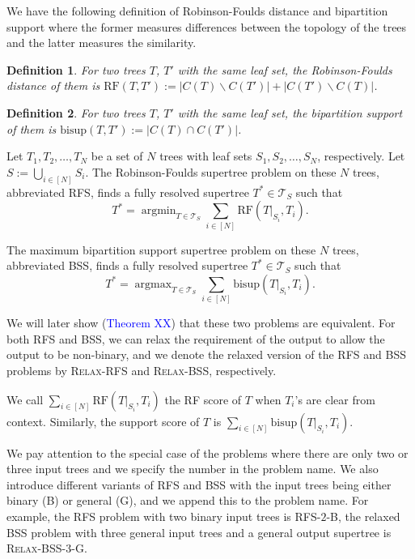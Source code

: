 \documentclass[twocolumn]{bmcart}%
\newcommand{\bs}{\mathrm{bisup}}
\newcommand{\RF}{\mathrm{RF}}
\newcommand{\bss}{\textsc{BSS}\xspace}
\newcommand{\rfs}{\textsc{RFS}\xspace}
\newcommand{\relaxed}{\textsc{Relax}-}
\newcommand{\bssthree}{\textsc{BSS-$3$}\xspace}
\newcommand{\rftwo}{\textsc{RFS-$2$}\xspace}
\newcommand{\B}{\textsc{B}\xspace}
\renewcommand{\G}{\textsc{G}\xspace}
\DeclareMathOperator*{\argmin}{argmin}
\DeclareMathOperator*{\argmax}{argmax}
\theoremstyle{mystyle}
\newtheorem{definition}{Definition}
\theoremstyle{proofstyle}
\begin{document}
We have the following definition of Robinson-Foulds distance \cite{RF} and bipartition support where the former measures differences between the topology of the trees and the latter measures the similarity.
\begin{definition}
For two trees $T$, $T'$ with the same leaf set, the \textit{Robinson-Foulds distance} of them is $\RF(T, T') := |C(T)\backslash C(T')| + |C(T') \backslash C(T)|$.
\end{definition}

\begin{definition}
For two trees $T$, $T'$ with the same leaf set, the \textit{bipartition support} of them is $\bs(T, T') := |C(T) \cap C(T')|$.
\end{definition}


Let $T_1,T_2,\dots,T_N$ be a set of $N$ trees with leaf sets $S_1,S_2,\dots,S_N$, respectively. Let $S := \bigcup_{i \in [N]}S_i$. 
The Robinson-Foulds supertree problem \cite{RFS} on these $N$ trees, abbreviated \rfs, finds a fully resolved supertree $T^* \in \mathcal{T}_S$ such that
\[T^* = \argmin_{T \in \mathcal{T}_S} \sum_{i \in [N]} \RF(T|_{S_i}, T_i).\]

The maximum bipartition support supertree problem on these $N$ trees, abbreviated \bss, finds a fully resolved supertree $T^* \in \mathcal{T}_S$ such that
\[T^* = \argmax_{T \in \mathcal{T}_S} \sum_{i \in [N]} \bs(T|_{S_i}, T_i).\]

We will later show (\textcolor{blue}{Theorem XX}) that these two problems are equivalent. For both \rfs and \bss, we can relax the requirement of the output to allow the output to be non-binary, and we denote the relaxed version of the \rfs and \bss problems by \relaxed\rfs and \relaxed\bss, respectively. 

We call $\sum_{i \in [N]} \RF(T|_{S_i}, T_i)$ the RF score of $T$ when $T_i$'s are clear from context. Similarly, the support score of $T$ is $\sum_{i\in[N]}\bs(T|_{S_i}, T_i)$. 

We pay attention to the special case of the problems where there are only two or three input trees and we specify the number in the problem name. 
We also introduce different variants of \rfs and \bss with the input trees being either binary (B) or general (G), and we append this to the problem name. For example, the RFS problem with two binary input trees is \rftwo-\B, the relaxed BSS problem with three general input trees and a general output supertree is \relaxed\bssthree-\G. 
\end{document}
